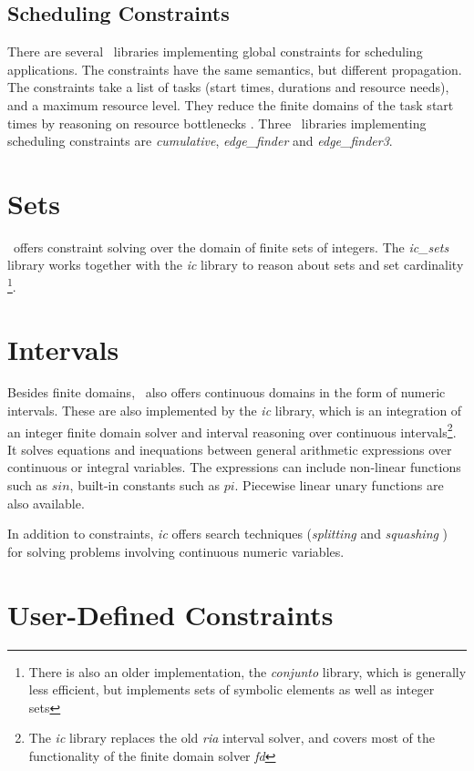 \subsection{Scheduling Constraints}
There are several \eclipse\  libraries implementing global constraints for
scheduling applications.  The constraints have the same semantics,
but different propagation.  The constraints take a list
of tasks (start times, durations and resource needs), and a maximum
resource level. They reduce the finite domains of the task start times
by reasoning on resource bottlenecks \cite{lepape}.  Three \eclipse\  libraries
implementing scheduling constraints are
{\em cumulative}, {\em edge\_finder} and {\em edge\_finder3}.

\section{Sets}
\eclipse\  offers constraint solving over the domain of finite sets of
integers. The {\em ic\_sets} library works together with the {\em ic} library
to reason about sets and set cardinality \cite{gervet}\footnote{
There is also an older implementation, the {\em conjunto} library, which
is generally less efficient, but implements sets of symbolic elements as
well as integer sets}.

\section{Intervals}
Besides finite domains, \eclipse\  also offers continuous domains in the
form of numeric intervals.
These are also implemented by the {\em ic} library, which is an integration
of an 
integer finite domain solver and interval reasoning over continuous
intervals\footnote{
The {\em ic} library replaces the old {\em ria} interval solver, and
covers most of the functionality of the finite domain solver {\em fd}}.
It solves equations and inequations between 
general arithmetic expressions over continuous or integral variables.
The expressions can include non-linear functions such as $sin$, built-in
constants such as $pi$. Piecewise linear unary functions are also available.

In addition to constraints, {\em ic} offers search techniques 
({\em splitting} \cite{VanHentenryck:95} and {\em squashing} 
\cite{lhomme96boosting})
for solving problems involving continuous numeric variables.


\section{User-Defined Constraints}

